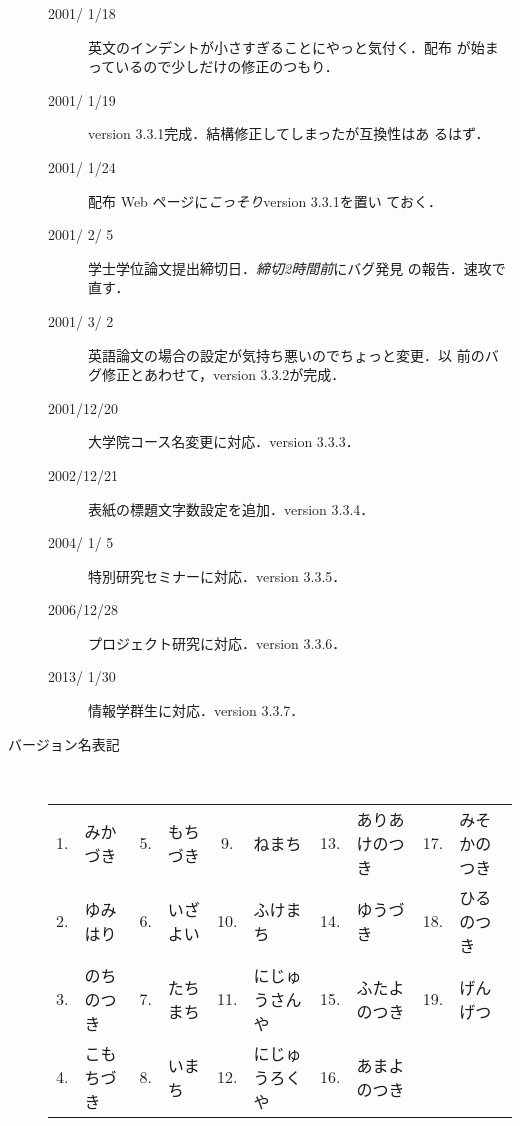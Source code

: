 \documentclass[mingoth]{kut-paper}		%
\begin{document}
\begin{description}
\begin{description}
  \item[2001/ 1/18] 英文のインデントが小さすぎることにやっと気付く．配布
			 が始まっているので少しだけの修正のつもり．
  \item[2001/ 1/19] version 3.3.1完成．結構修正してしまったが互換性はあ
			 るはず．
  \item[2001/ 1/24] 配布 Web ページに\emph{こっそり}version 3.3.1を置い
			 ておく．
  \item[2001/ 2/ 5] 学士学位論文提出締切日．\emph{締切2時間前}にバグ発見
			 の報告．速攻で直す．
  \item[2001/ 3/ 2] 英語論文の場合の設定が気持ち悪いのでちょっと変更．以
			 前のバグ修正とあわせて，version 3.3.2が完成．
  \item[2001/12/20] 大学院コース名変更に対応．version 3.3.3．
  \item[2002/12/21] 表紙の標題文字数設定を追加．version 3.3.4．
  \item[2004/ 1/ 5] 特別研究セミナーに対応．version 3.3.5．
  \item[2006/12/28] プロジェクト研究に対応．version 3.3.6．
  \item[2013/ 1/30] 情報学群生に対応．version 3.3.7．
 \end{description}
 
 \vspace{1zh}
 \item[バージョン名表記]~\\
  \begin{tabular}{*{5}{cp{}}}
   1.&みかづき	&5.&もちづき& 9.&ねまち		   &13.&ありあけのつき&17.&みそかのつき	\\
   2.&ゆみはり	&6.&いざよい&10.&ふけまち	   &14.&ゆうづき	  &18.&ひるのつき	\\
   3.&のちのつき&7.&たちまち&11.&にじゅうさんや&15.&ふたよのつき  &19.&げんげつ		\\
   4.&こもちづき&8.&いまち	&12.&にじゅうろくや&16.&あまよのつき					\\
  \end{tabular}
\end{description}
\end{document}

